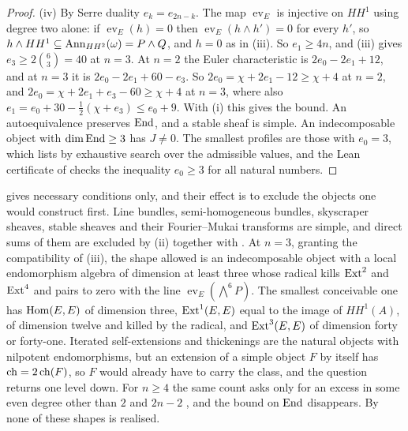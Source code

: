 \begin{proof}
(iv) By Serre duality $e_{k}=e_{2n-k}$. The map $\operatorname{ev}_{E}$ is
injective on $HH^{1}$ using degree two alone: if $\operatorname{ev}_{E}(h)=0$
then $\operatorname{ev}_{E}(h\wedge h')=0$ for every $h'$, so
$h\wedge HH^{1}\subseteq\operatorname{Ann}_{HH^{2}}(\omega)=P\wedge Q$, and $h=0$ as in
(iii). So $e_{1}\ge4n$, and (iii) gives
$e_{3}\ge2\binom{6}{3}=40$ at $n=3$. At $n=2$ the Euler
characteristic is $2e_{0}-2e_{1}+12$, and at $n=3$ it is
$2e_{0}-2e_{1}+60-e_{3}$. So $2e_{0}=\chi+2e_{1}-12\ge\chi+4$ at $n=2$, and
$2e_{0}=\chi+2e_{1}+e_{3}-60\ge\chi+4$ at $n=3$, where also
$e_{1}=e_{0}+30-\frac12(\chi+e_{3})\le e_{0}+9$. With (i) this gives the
bound. An autoequivalence preserves $\operatorname{End}$, and a stable sheaf is simple.
An indecomposable object with $\dim\operatorname{End}\ge3$ has $J\ne0$. The smallest
profiles are those with $e_{0}=3$, which \cite{BMB26} lists by exhaustive search
over the admissible values, and the Lean certificate of \cite{BMB26} checks the
inequality $e_{0}\ge3$ for all natural numbers.
\end{proof}

\begin{remark}\label{rem:p2endo}
 gives necessary conditions only, and their effect is to
exclude the objects one would construct first. Line bundles, semi-homogeneous
bundles, skyscraper sheaves, stable sheaves and their Fourier--Mukai
transforms are simple, and direct sums of them are excluded by (ii) together
with . At $n=3$, granting the compatibility of
(iii), the shape allowed is an indecomposable object
with a local endomorphism algebra of dimension at least three whose radical
kills $\operatorname{Ext}^{2}$ and $\operatorname{Ext}^{4}$ and pairs to zero with the line
$\operatorname{ev}_{E}(\bigwedge^{6}P)$. The smallest conceivable one has
$\operatorname{Hom}(E,E)$ of dimension three, $\operatorname{Ext}^{1}(E,E)$ equal to the image of
$HH^{1}(A)$, of dimension twelve and killed by the radical, and
$\operatorname{Ext}^{3}(E,E)$ of dimension forty or forty-one. Iterated self-extensions and
thickenings are the natural objects with nilpotent endomorphisms, but an
extension of a simple object $F$ by itself has $\operatorname{ch}=2\operatorname{ch}(F)$, so $F$ would
already have to carry the class, and the question returns one level down.
For $n\ge4$ the same count asks only for an excess in some even degree other
than $2$ and $2n-2$ \cite{BMB26}, and the bound on $\operatorname{End}$ disappears. By
 none of these shapes is realised.
\end{remark}
